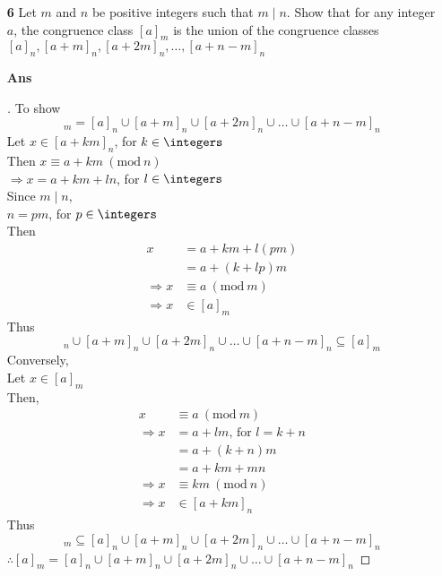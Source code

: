 \documentclass[paper=usletter, fontsize=12pt]{article}
\newcommand{\Mod}[1]{\ (\mathrm{mod}\ #1)}
\begin{document}
\begin{itemize}
\begin{itemize}
            \item[\textbf{6}] Let $m$ and $n$ be positive integers such that
            $m\mid n$. Show that for any integer $a$, the congruence class
            $[a]_m$ is the union of the congruence classes $[a]_n, [a+m]_n, [a+2m]_n, \ldots, [a+n-m]_n$
            \item[\textbf{Ans}]
            \begin{proof}[\unskip\nopunct]
                To show
                \begin{equation*}
                    [a]_m = [a]_n \cup [a+m]_n \cup [a+2m]_n \cup \ldots \cup [a+n-m]_n
                \end{equation*}
                Let $x \in [a+km]_n$, for $k \in \integers$\\
                Then $x \equiv a+km \Mod{n}$\\
                $\Rightarrow x = a+km+ln$, for $l \in \integers$\\
                Since $m \mid n$,\\
                $n = pm$, for $p \in \integers$\\
                Then
                \begin{align*}
                    x &= a+km+l(pm)\\
                    & = a + (k+lp)m\\
                    \Rightarrow x & \equiv a \Mod{m}\\
                    \Rightarrow x & \in [a]_m
                \end{align*}
                Thus
                \begin{equation*}
                    [a]_n \cup [a+m]_n \cup [a+2m]_n \cup \ldots \cup [a+n-m]_n \subseteq [a]_m
                \end{equation*}
                Conversely,\\
                Let $x \in [a]_m$\\
                Then,
                \begin{align*}
                    x & \equiv a \Mod{m}\\
                    \Rightarrow x & = a + lm \text{, for $l = k+n$}\\
                    & = a + (k+n)m\\
                    & = a + km + mn\\
                    \Rightarrow x & \equiv km \Mod{n}\\
                    \Rightarrow x & \in [a+km]_n
                \end{align*}
                Thus
                \begin{equation*}
                    [a]_m \subseteq [a]_n \cup [a+m]_n \cup [a+2m]_n \cup \ldots \cup [a+n-m]_n
                \end{equation*}
                $\therefore [a]_m = [a]_n \cup [a+m]_n \cup [a+2m]_n \cup \ldots \cup [a+n-m]_n$ \qedhere
            \end{proof}
            \vspace{0.2in}


\end{itemize}
\end{itemize}
\end{document}
